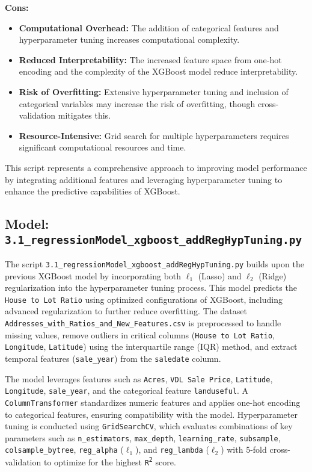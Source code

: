 \textbf{Cons:}
\begin{itemize}
    \item \textbf{Computational Overhead:} The addition of categorical features and hyperparameter tuning increases computational complexity.
    \item \textbf{Reduced Interpretability:} The increased feature space from one-hot encoding and the complexity of the XGBoost model reduce interpretability.
    \item \textbf{Risk of Overfitting:} Extensive hyperparameter tuning and inclusion of categorical variables may increase the risk of overfitting, though cross-validation mitigates this.
    \item \textbf{Resource-Intensive:} Grid search for multiple hyperparameters requires significant computational resources and time.
\end{itemize}

This script represents a comprehensive approach to improving model performance by integrating additional features and leveraging hyperparameter tuning to enhance the predictive capabilities of XGBoost. \\

\hrulefill

\subsection{Model: \texttt{3.1\_regressionModel\_xgboost\_addRegHypTuning.py}}

The script \texttt{3.1\_regressionModel\_xgboost\_addRegHypTuning.py} builds upon the previous XGBoost model by incorporating both \(\ell_1\) (Lasso) and \(\ell_2\) (Ridge) regularization into the hyperparameter tuning process. This model predicts the \texttt{House to Lot Ratio} using optimized configurations of XGBoost, including advanced regularization to further reduce overfitting. The dataset \texttt{Addresses\_with\_Ratios\_and\_New\_Features.csv} is preprocessed to handle missing values, remove outliers in critical columns (\texttt{House to Lot Ratio}, \texttt{Longitude}, \texttt{Latitude}) using the interquartile range (IQR) method, and extract temporal features (\texttt{sale\_year}) from the \texttt{saledate} column.

The model leverages features such as \texttt{Acres}, \texttt{VDL Sale Price}, \texttt{Latitude}, \texttt{Longitude}, \texttt{sale\_year}, and the categorical feature \texttt{landuseful}. A \texttt{ColumnTransformer} standardizes numeric features and applies one-hot encoding to categorical features, ensuring compatibility with the model. Hyperparameter tuning is conducted using \texttt{GridSearchCV}, which evaluates combinations of key parameters such as \texttt{n\_estimators}, \texttt{max\_depth}, \texttt{learning\_rate}, \texttt{subsample}, \texttt{colsample\_bytree}, \texttt{reg\_alpha} (\(\ell_1\)), and \texttt{reg\_lambda} (\(\ell_2\)) with 5-fold cross-validation to optimize for the highest \texttt{R\textsuperscript{2}} score.

